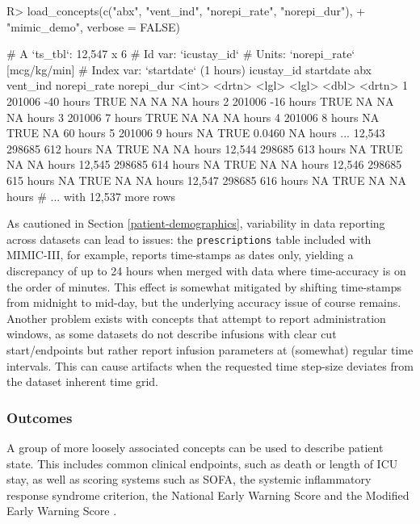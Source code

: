 \documentclass[
]{jss}
\begin{document}
\begin{CodeChunk}
\begin{CodeInput}
R> load_concepts(c("abx", "vent_ind", "norepi_rate", "norepi_dur"),
+               "mimic_demo", verbose = FALSE)
\end{CodeInput}
\begin{CodeOutput}
# A `ts_tbl`: 12,547 x 6
# Id var:     `icustay_id`
# Units:      `norepi_rate` [mcg/kg/min]
# Index var:  `startdate` (1 hours)
       icustay_id startdate abx   vent_ind norepi_rate norepi_dur
            <int> <drtn>    <lgl> <lgl>          <dbl> <drtn>
     1     201006 -40 hours TRUE  NA           NA      NA hours
     2     201006 -16 hours TRUE  NA           NA      NA hours
     3     201006   7 hours TRUE  NA           NA      NA hours
     4     201006   8 hours NA    TRUE         NA      60 hours
     5     201006   9 hours NA    TRUE          0.0460 NA hours
   ...
12,543     298685 612 hours NA    TRUE         NA      NA hours
12,544     298685 613 hours NA    TRUE         NA      NA hours
12,545     298685 614 hours NA    TRUE         NA      NA hours
12,546     298685 615 hours NA    TRUE         NA      NA hours
12,547     298685 616 hours NA    TRUE         NA      NA hours
# ... with 12,537 more rows
\end{CodeOutput}
\end{CodeChunk}

As cautioned in Section \ref{patient-demographics}, variability in data
reporting across datasets can lead to issues: the \texttt{prescriptions}
table included with MIMIC-III, for example, reports time-stamps as dates
only, yielding a discrepancy of up to 24 hours when merged with data
where time-accuracy is on the order of minutes. This effect is somewhat
mitigated by shifting time-stamps from midnight to mid-day, but the
underlying accuracy issue of course remains. Another problem exists with
concepts that attempt to report administration windows, as some datasets
do not describe infusions with clear cut start/endpoints but rather
report infusion parameters at (somewhat) regular time intervals. This
can cause artifacts when the requested time step-size deviates from the
dataset inherent time grid.

\hypertarget{outcomes}{%
\subsubsection{Outcomes}\label{outcomes}}

A group of more loosely associated concepts can be used to describe
patient state. This includes common clinical endpoints, such as death or
length of ICU stay, as well as scoring systems such as SOFA, the
systemic inflammatory response syndrome \citep[SIRS;][]{bone1992}
criterion, the National Early Warning Score \citep[NEWS;][]{jones2012}
and the Modified Early Warning Score \citep[MEWS;][]{subbe2001}.
\end{document}
